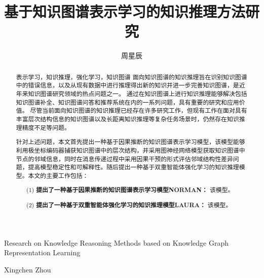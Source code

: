 \documentclass[algorithmlist, AutoFakeBold, AutoFakeSlant, figurelist, tablelist, nomlist, masters]{seuthesix}
\begin{document}
\captionsetup{labelformat=default, labelsep=space}

% 
\setcounter{secnumdepth}{4}
\setcounter{tocdepth}{4}
\newtheorem{definition}{定义}[chapter]
\newcommand{\tabincell}[2]{\begin{tabular}{@{}#1@{}}#2\end{tabular}}  

\title{基于知识图谱表示学习的知识推理方法研究}{}{Research on Knowledge Reasoning Methods based on Knowledge Graph Representation Learning}{}
\author{周星辰}{Xingchen Zhou}
\submajor{}
\authorizedate{\ }
\committeechair{}
\reviewer{}{}
\makebigcover
\makecover

\begin{abstract}{表示学习，知识推理，强化学习，知识图谱}
面向知识图谱的知识推理旨在识别知识图谱中的错误信息，以及从现有数据中进行推理得出新的知识并进一步完善知识图谱，是近年来知识图谱研究领域的热点问题之一。
通过在知识图谱上进行知识推理能够解决包括知识图谱补全、知识图谱问答和推荐系统在内的一系列问题，具有重要的研究和应用价值。
尽管当前面向知识图谱的知识推理已经存在许多研究工作，但现有工作在面对具有丰富层次结构信息的知识图谱以及长距离知识推理等复杂任务场景时，仍然存在知识推理精度不足等问题。

针对上述问题，本文首先提出一种基于因果推断的知识图谱表示学习模型，该模型能够利用极坐标编码器捕获知识图谱中的层次结构，并采用图神经网络模型获取知识图谱中节点的邻域信息，同时在消息传递过程中采用因果干预的形式评估邻域结构性差异问题，提高模型稳定性和可解释性。随后提出一种基于双重智能体强化学习的知识推理模型。本文的主要工作包括：
\begin{itemize}
  \item [(1)] \textbf{提出了一种基于因果推断的知识图谱表示学习模型NORMAN：} 该模型。
  \item [(2)] \textbf{提出了一种基于双重智能体强化学习的知识推理模型LAURA：} 该模型。
\end{itemize}
\end{abstract}
\end{document}

